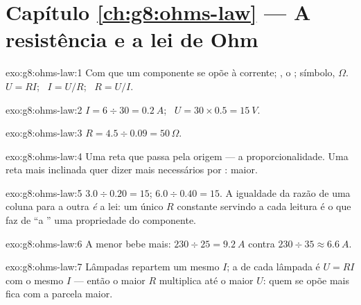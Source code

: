 \section*{Capítulo \ref{ch:g8:ohms-law} --- A resistência e a lei de Ohm}

\begin{solution}{exo:g8:ohms-law:1}
Com que  um componente se opõe à corrente; , o ;
símbolo, $\Omega$. $U = R I$; \ $I = U/R$; \ $R = U/I$.
\end{solution}

\begin{solution}{exo:g8:ohms-law:2}
$I = 6 \div 30 = \qty{0.2}{A}$; \ $U = 30 \times 0.5 = \qty{15}{V}$.
\end{solution}

\begin{solution}{exo:g8:ohms-law:3}
$R = 4.5 \div 0.09 = 50\,\Omega$.
\end{solution}

\begin{solution}{exo:g8:ohms-law:4}
Uma reta que passa pela origem --- a proporcionalidade. Uma reta mais
inclinada quer dizer mais  necessários por : 
maior.
\end{solution}

\begin{solution}{exo:g8:ohms-law:5}
$3.0 \div 0.20 = 15$; $6.0 \div 0.40 = 15$. A igualdade da razão de
uma coluna para a outra \emph{é} a lei: um único $R$ constante
servindo a cada leitura é o que faz de ``a '' uma
propriedade do componente.
\end{solution}

\begin{solution}{exo:g8:ohms-law:6}
A  menor bebe mais: $230 \div 25 = \qty{9.2}{A}$ contra
$230 \div 35 \approx \qty{6.6}{A}$.
\end{solution}

\begin{solution}{exo:g8:ohms-law:7}
Lâmpadas  repartem um mesmo $I$; a  de cada lâmpada é
$U = R I$ com o mesmo $I$ --- então o maior $R$ multiplica até o maior
$U$: quem se opõe mais fica com a parcela maior.
\end{solution}

